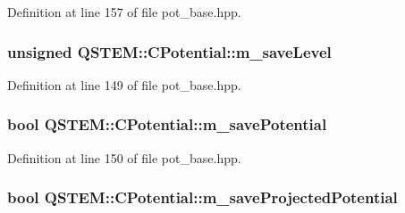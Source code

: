 Definition at line 157 of file pot\-\_\-base.\-hpp.

\hypertarget{class_q_s_t_e_m_1_1_c_potential_ad9f398d505dd12cdc0fb48f0433c27c9}{
\subsubsection[{m\-\_\-save\-Level}]{\setlength{\rightskip}{0pt plus 5cm}unsigned Q\-S\-T\-E\-M\-::\-C\-Potential\-::m\-\_\-save\-Level\hspace{0.3cm}{\ttfamily [protected]}}}\label{class_q_s_t_e_m_1_1_c_potential_ad9f398d505dd12cdc0fb48f0433c27c9}


Definition at line 149 of file pot\-\_\-base.\-hpp.

\hypertarget{class_q_s_t_e_m_1_1_c_potential_a64edcf6510a7c9a8e7f0b69a7288b111}{
\subsubsection[{m\-\_\-save\-Potential}]{\setlength{\rightskip}{0pt plus 5cm}bool Q\-S\-T\-E\-M\-::\-C\-Potential\-::m\-\_\-save\-Potential\hspace{0.3cm}{\ttfamily [protected]}}}\label{class_q_s_t_e_m_1_1_c_potential_a64edcf6510a7c9a8e7f0b69a7288b111}


Definition at line 150 of file pot\-\_\-base.\-hpp.

\hypertarget{class_q_s_t_e_m_1_1_c_potential_a8a65588b67238508c7508d929f83c30c}{
\subsubsection[{m\-\_\-save\-Projected\-Potential}]{\setlength{\rightskip}{0pt plus 5cm}bool Q\-S\-T\-E\-M\-::\-C\-Potential\-::m\-\_\-save\-Projected\-Potential\hspace{0.3cm}{\ttfamily [protected]}}}\label{class_q_s_t_e_m_1_1_c_potential_a8a65588b67238508c7508d929f83c30c}


